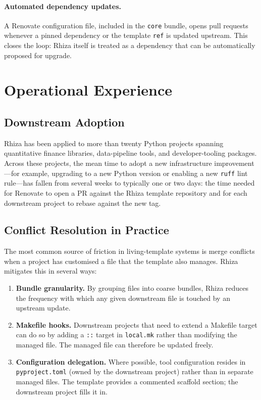 \documentclass[12pt,a4paper]{article}
\begin{document}
\paragraph{Automated dependency updates.} A Renovate configuration file, included in the \texttt{core} bundle, opens pull requests whenever a pinned dependency or the template \texttt{ref} is updated upstream. This closes the loop: Rhiza itself is treated as a dependency that can be automatically proposed for upgrade.

\section{Operational Experience}
\label{sec:experience}

\subsection{Downstream Adoption}

Rhiza has been applied to more than twenty Python projects spanning quantitative finance libraries, data-pipeline tools, and developer-tooling packages. Across these projects, the mean time to adopt a new infrastructure improvement---for example, upgrading to a new Python version or enabling a new \texttt{ruff} lint rule---has fallen from several weeks to typically one or two days: the time needed for Renovate to open a PR against the Rhiza template repository and for each downstream project to rebase against the new tag.

\subsection{Conflict Resolution in Practice}

The most common source of friction in living-template systems is merge conflicts when a project has customised a file that the template also manages. Rhiza mitigates this in several ways:

\begin{enumerate}[leftmargin=*]
  \item \textbf{Bundle granularity.} By grouping files into coarse bundles, Rhiza reduces the frequency with which any given downstream file is touched by an upstream update.
  \item \textbf{Makefile hooks.} Downstream projects that need to extend a Makefile target can do so by adding a \texttt{::} target in \texttt{local.mk} rather than modifying the managed file. The managed file can therefore be updated freely.
  \item \textbf{Configuration delegation.} Where possible, tool configuration resides in \texttt{pyproject.toml} (owned by the downstream project) rather than in separate managed files. The template provides a commented scaffold section; the downstream project fills it in.
\end{enumerate}
\end{document}
